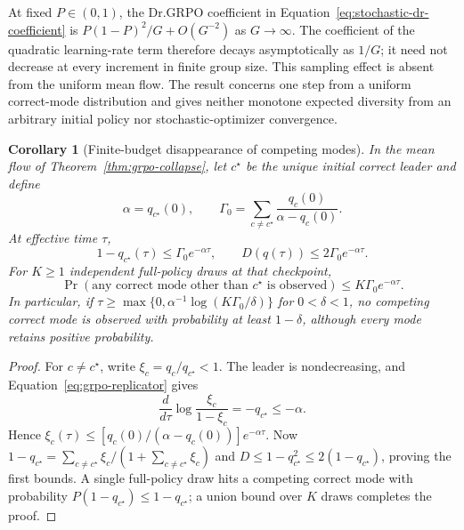 \documentclass{article}
\newcommand{\enforcehalffinalproseline}{%
  \setlength{\parfillskip}{0pt plus .20\linewidth}}
\newcommand{\1}{\mathbf 1}
\newtheorem{corollary}[lemma]{Corollary}
\theoremstyle{remark}
\theoremstyle{definition}
\theoremstyle{plain}
\begin{document}
At fixed $P\in(0,1)$, the Dr.GRPO coefficient in
Equation~\eqref{eq:stochastic-dr-coefficient} is
$P(1-P)^2/G+O(G^{-2})$ as $G\to\infty$. The coefficient of the
quadratic learning-rate term therefore decays asymptotically as $1/G$;
it need not decrease at every increment in finite group size. This sampling
effect is absent from the uniform mean flow. The result concerns one step
from a uniform correct-mode distribution and gives neither monotone expected
diversity from an arbitrary initial policy nor stochastic-optimizer convergence.

\begin{corollary}[Finite-budget disappearance of competing modes]
\enforcehalffinalproseline
\label{cor:finite-budget-invisibility}
In the mean flow of Theorem~\ref{thm:grpo-collapse}, let $c^\star$ be the
unique initial correct leader and define
\[
 \alpha=q_{c^\star}(0),
 \qquad
 \Gamma_0=\sum_{c\ne c^\star}
             \frac{q_c(0)}{\alpha-q_c(0)}.
\]
At effective time $\tau$,
\begin{equation}
 1-q_{c^\star}(\tau)\le\Gamma_0e^{-\alpha\tau},
 \qquad D(q(\tau))\le2\Gamma_0e^{-\alpha\tau}.
 \label{eq:finite-minority-bound}
\end{equation}
For $K\ge1$ independent full-policy draws at that checkpoint,
\begin{equation}
 \Pr(\text{any correct mode other than }c^\star\text{ is observed})
 \le K\Gamma_0e^{-\alpha\tau}.
 \label{eq:finite-inference-visibility}
\end{equation}
In particular, if
$\tau\ge\max\{0,\alpha^{-1}\log(K\Gamma_0/\delta)\}$ for
$0<\delta<1$, no competing correct mode is observed with probability at
least $1-\delta$, although every mode retains positive probability.
\end{corollary}

\begin{proof}
\enforcehalffinalproseline
For $c\ne c^\star$, write $\xi_c=q_c/q_{c^\star}<1$.
The leader is nondecreasing, and Equation~\eqref{eq:grpo-replicator} gives
\[
 \frac{d}{d\tau}\log\frac{\xi_c}{1-\xi_c}
 =-q_{c^\star}\le-\alpha.
\]
Hence
$\xi_c(\tau)\le[q_c(0)/(\alpha-q_c(0))]e^{-\alpha\tau}$.
Now $1-q_{c^\star}=\sum_{c\ne c^\star}\xi_c/(1+\sum_{c\ne c^\star}\xi_c)$
and $D\le1-q_{c^\star}^2\le2(1-q_{c^\star})$, proving the first bounds.
A single full-policy draw hits a competing correct mode with probability
$P(1-q_{c^\star})\le1-q_{c^\star}$; a union bound over $K$ draws completes
the proof.
\end{proof}
\end{document}
